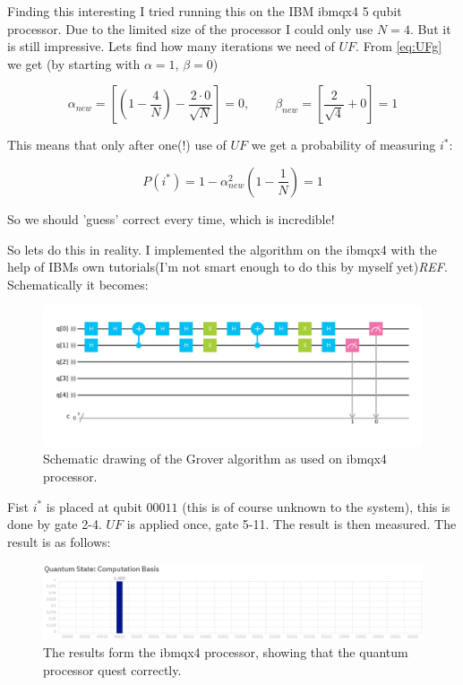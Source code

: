 \documentclass[a4paper,norsk, 10pt]{article}
\begin{document}
Finding this interesting I tried running this on the IBM ibmqx4 5 qubit processor. Due to the limited size of the processor I could only use $N=4$. But it is still impressive. Lets find how many iterations we need of $UF$. From \eqref{eq:UFg} we get (by starting with $\alpha = 1$, $\beta = 0$)

\begin{equation}
\alpha_{new} = \left[\left(1 - \frac{4}{N}\right) - \frac{2\cdot 0}{\sqrt{N}}\right] = 0, \qquad \beta_{new} = \left[\frac{2}{\sqrt{4}} + 0\right] = 1
\end{equation}

This means that only after one(!) use of $UF$ we get a probability of measuring $i^*$:

\begin{equation}
P(i^*) = 1 - \alpha^2_{new}\left(1 - \frac{1}{N}\right) = 1
\end{equation}

So we should 'guess' correct every time, which is incredible!

So lets do this in reality. I implemented the algorithm on the ibmqx4 with the help of IBMs own tutorials(I'm not smart enough to do this by myself yet)\emph{REF}. Schematically it becomes:

\begin{figure}[H]
\centering
\includegraphics[scale=0.2]{groverIBM.png}
\caption{Schematic drawing of the Grover algorithm as used on ibmqx4 processor.}
\end{figure}

Fist $i^*$ is placed at qubit $00011$ (this is of course unknown to the system), this is done by gate 2-4. $UF$ is applied once, gate 5-11. The result is then measured. The result is as follows:

\begin{figure}[H]
\centering
\includegraphics[scale=0.4]{IBMresultat.png}
\caption{The results form the ibmqx4 processor, showing that the quantum processor quest correctly.}
\end{figure}
\end{document}
